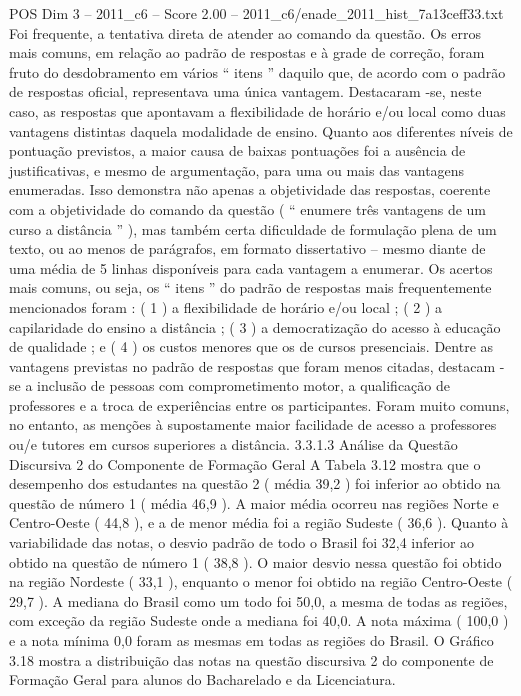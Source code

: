 \begin{textsample}{POS Dim 3 – 2011\_c6 – Score 2.00 – 2011\_c6/enade\_2011\_hist\_7a13ceff33.txt}
Foi frequente, a tentativa direta de atender ao comando da questão.
Os erros mais comuns, em relação ao padrão de respostas e à grade de correção, foram fruto do desdobramento em vários “ itens ” daquilo que, de acordo com o padrão de respostas oficial, representava uma única vantagem.
Destacaram -se, neste caso, as respostas que apontavam a flexibilidade de horário e/ou local como duas vantagens distintas daquela modalidade de ensino.
Quanto aos diferentes níveis de pontuação previstos, a maior causa de baixas pontuações foi a ausência de justificativas, e mesmo de argumentação, para uma ou mais das vantagens enumeradas.
Isso demonstra não apenas a objetividade das respostas, coerente com a objetividade do comando da questão ( “ enumere três vantagens de um curso a distância ” ), mas também certa dificuldade de formulação plena de um texto, ou ao menos de parágrafos, em formato dissertativo – mesmo diante de uma média de 5 linhas disponíveis para cada vantagem a enumerar.
Os acertos mais comuns, ou seja, os “ itens ” do padrão de respostas mais frequentemente mencionados foram : ( 1 ) a flexibilidade de horário e/ou local ; ( 2 ) a capilaridade do ensino a distância ; ( 3 ) a democratização do acesso à educação de qualidade ; e ( 4 ) os custos menores que os de cursos presenciais.
Dentre as vantagens previstas no padrão de respostas que foram menos citadas, destacam -se a inclusão de pessoas com comprometimento motor, a qualificação de professores e a troca de experiências entre os participantes.
Foram muito comuns, no entanto, as menções à supostamente maior facilidade de acesso a professores ou/e tutores em cursos superiores a distância. 3.3.1.3 Análise da Questão Discursiva 2 do Componente de Formação Geral A Tabela 3.12 mostra que o desempenho dos estudantes na questão 2 ( média 39,2 ) foi inferior ao obtido na questão de número 1 ( média 46,9 ).
A maior média ocorreu nas regiões Norte e Centro-Oeste ( 44,8 ), e a de menor média foi a região Sudeste ( 36,6 ).
Quanto à variabilidade das notas, o desvio padrão de todo o Brasil foi 32,4 inferior ao obtido na questão de número 1 ( 38,8 ).
O maior desvio nessa questão foi obtido na região Nordeste ( 33,1 ), enquanto o menor foi obtido na região Centro-Oeste ( 29,7 ).
A mediana do Brasil como um todo foi 50,0, a mesma de todas as regiões, com exceção da região Sudeste onde a mediana foi 40,0.
A nota máxima ( 100,0 ) e a nota mínima 0,0 foram as mesmas em todas as regiões do Brasil.
O Gráfico 3.18 mostra a distribuição das notas na questão discursiva 2 do componente de Formação Geral para alunos do Bacharelado e da Licenciatura.

\end{textsample}
